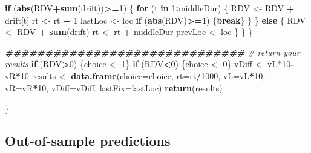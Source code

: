 \documentclass[
]{book}
\newenvironment{Shaded}{\begin{snugshade}}{\end{snugshade}}
\newcommand{\AttributeTok}[1]{\textcolor[rgb]{0.13,0.29,0.53}{#1}}
\newcommand{\CommentTok}[1]{\textcolor[rgb]{0.56,0.35,0.01}{\textit{#1}}}
\newcommand{\ControlFlowTok}[1]{\textcolor[rgb]{0.13,0.29,0.53}{\textbf{#1}}}
\newcommand{\DecValTok}[1]{\textcolor[rgb]{0.00,0.00,0.81}{#1}}
\newcommand{\DocumentationTok}[1]{\textcolor[rgb]{0.56,0.35,0.01}{\textbf{\textit{#1}}}}
\newcommand{\FunctionTok}[1]{\textcolor[rgb]{0.13,0.29,0.53}{\textbf{#1}}}
\newcommand{\NormalTok}[1]{#1}
\newcommand{\OtherTok}[1]{\textcolor[rgb]{0.56,0.35,0.01}{#1}}
\newcommand{\SpecialCharTok}[1]{\textcolor[rgb]{0.81,0.36,0.00}{\textbf{#1}}}
\begin{document}
\begin{Shaded}
\begin{Highlighting}[]
      \ControlFlowTok{if}\NormalTok{ (}\FunctionTok{abs}\NormalTok{(RDV}\SpecialCharTok{+}\FunctionTok{sum}\NormalTok{(drift))}\SpecialCharTok{\textgreater{}=}\DecValTok{1}\NormalTok{) \{}
        \ControlFlowTok{for}\NormalTok{ (t }\ControlFlowTok{in} \DecValTok{1}\SpecialCharTok{:}\NormalTok{middleDur) \{}
\NormalTok{          RDV }\OtherTok{\textless{}{-}}\NormalTok{ RDV }\SpecialCharTok{+}\NormalTok{ drift[t]}
\NormalTok{          rt }\OtherTok{\textless{}{-}}\NormalTok{ rt }\SpecialCharTok{+} \DecValTok{1}
\NormalTok{          lastLoc }\OtherTok{\textless{}{-}}\NormalTok{ loc}
          \ControlFlowTok{if}\NormalTok{ (}\FunctionTok{abs}\NormalTok{(RDV)}\SpecialCharTok{\textgreater{}=}\DecValTok{1}\NormalTok{) \{}\ControlFlowTok{break}\NormalTok{\}}
\NormalTok{        \}}
\NormalTok{      \} }\ControlFlowTok{else}\NormalTok{ \{}
\NormalTok{        RDV }\OtherTok{\textless{}{-}}\NormalTok{ RDV }\SpecialCharTok{+} \FunctionTok{sum}\NormalTok{(drift)}
\NormalTok{        rt }\OtherTok{\textless{}{-}}\NormalTok{ rt }\SpecialCharTok{+}\NormalTok{ middleDur}
\NormalTok{        prevLoc }\OtherTok{\textless{}{-}}\NormalTok{ loc}
\NormalTok{      \}}
\NormalTok{    \}}
\NormalTok{  \}}

  \DocumentationTok{\#\#\#\#\#\#\#\#\#\#\#\#\#\#\#\#\#\#\#\#\#\#\#\#\#\#\#\#\#\#}
  \CommentTok{\# return your results}
  \ControlFlowTok{if}\NormalTok{ (RDV}\SpecialCharTok{\textgreater{}}\DecValTok{0}\NormalTok{) \{choice }\OtherTok{\textless{}{-}} \DecValTok{1}\NormalTok{\}}
  \ControlFlowTok{if}\NormalTok{ (RDV}\SpecialCharTok{\textless{}}\DecValTok{0}\NormalTok{) \{choice }\OtherTok{\textless{}{-}} \DecValTok{0}\NormalTok{\}}
\NormalTok{  vDiff }\OtherTok{\textless{}{-}}\NormalTok{ vL}\SpecialCharTok{*}\DecValTok{10}\SpecialCharTok{{-}}\NormalTok{vR}\SpecialCharTok{*}\DecValTok{10}
\NormalTok{  results }\OtherTok{\textless{}{-}} \FunctionTok{data.frame}\NormalTok{(}\AttributeTok{choice=}\NormalTok{choice, }\AttributeTok{rt=}\NormalTok{rt}\SpecialCharTok{/}\DecValTok{1000}\NormalTok{, }\AttributeTok{vL=}\NormalTok{vL}\SpecialCharTok{*}\DecValTok{10}\NormalTok{, }\AttributeTok{vR=}\NormalTok{vR}\SpecialCharTok{*}\DecValTok{10}\NormalTok{, }\AttributeTok{vDiff=}\NormalTok{vDiff, }\AttributeTok{lastFix=}\NormalTok{lastLoc)}
  \FunctionTok{return}\NormalTok{(results)}
  
\NormalTok{\}}
\end{Highlighting}
\end{Shaded}

\hypertarget{out-of-sample-predictions}{%
\subsection{Out-of-sample predictions}\label{out-of-sample-predictions}}
\end{document}

